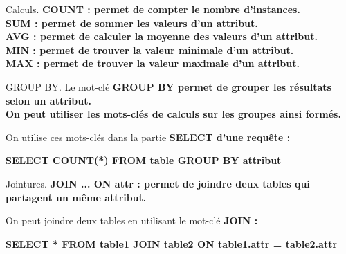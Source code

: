 \documentclass[french, 11pt]{article}
\begin{document}
\vspace*{-0.7cm}

\begin{defi}{Calculs.}{}
    \bf{COUNT} : permet de compter le nombre d'instances.\\
    \bf{SUM} : permet de sommer les valeurs d'un attribut.\\
    \bf{AVG} : permet de calculer la moyenne des valeurs d'un attribut.\\
    \bf{MIN} : permet de trouver la valeur minimale d'un attribut.\\
    \bf{MAX} : permet de trouver la valeur maximale d'un attribut.
\end{defi}

\vspace*{-0.7cm}

\begin{defi}{GROUP BY.}{}
    Le mot-clé \bf{GROUP BY} permet de grouper les résultats selon un attribut.\\
    On peut utiliser les mots-clés de calculs sur les groupes ainsi formés.
\end{defi}

\vspace*{-0.7cm}

\begin{ex}{}{}
    On utilise ces mots-clés dans la partie \bf{SELECT} d'une requête :
    \begin{center}
        \bf{SELECT} \bf{COUNT}(*) \bf{FROM} table \bf{GROUP BY} attribut
    \end{center}
\end{ex}

\vspace*{-0.7cm}

\begin{defi}{Jointures.}{}
    \bf{JOIN} ... \bf{ON} attr : permet de joindre deux tables qui partagent un même attribut.
\end{defi}

\vspace*{-0.7cm}

\begin{ex}{}{}
    On peut joindre deux tables en utilisant le mot-clé \bf{JOIN} :
    \begin{center}
        \bf{SELECT} * \bf{FROM} table1 \bf{JOIN} table2 \bf{ON} table1.attr = table2.attr
    \end{center}
\end{ex}

\vspace*{-0.7cm}
\end{document}
